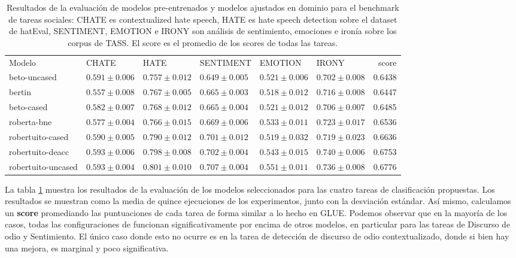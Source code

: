\begin{table}
    \centering
    \footnotesize
    \begin{tabular}{llllllr}
        \toprule
        Modelo             & CHATE             &  HATE             &  SENTIMENT        &  EMOTION          &  IRONY            &     score \\
        beto-uncased       & $0.591 \pm 0.006$ &  $0.757 \pm 0.012$ & $0.649 \pm 0.005$ & $0.521 \pm 0.006$ & $0.702 \pm 0.008$ &  0.6438 \\
        bertin             & $0.557 \pm 0.008$ &  $0.767 \pm 0.005$ & $0.665 \pm 0.003$ & $0.518 \pm 0.012$ & $0.716 \pm 0.008$ &  0.6447 \\
        beto-cased         & $0.582 \pm 0.007$ &  $0.768 \pm 0.012$ & $0.665 \pm 0.004$ & $0.521 \pm 0.012$ & $0.706 \pm 0.007$ &  0.6485 \\
        roberta-bne        & $0.577 \pm 0.004$ &  $0.766 \pm 0.015$ & $0.669 \pm 0.006$ & $0.533 \pm 0.011$ & $0.723 \pm 0.017$ &  0.6536 \\
        \hline
        robertuito-cased   & $0.590 \pm 0.005$ &  $0.790 \pm 0.012$ & $0.701 \pm 0.012$ & $0.519 \pm 0.032$ & $0.719 \pm 0.023$ &  0.6636 \\
        robertuito-deacc   & $0.593 \pm 0.006$ &  $0.798 \pm 0.008$ & $0.702 \pm 0.004$ & $0.543 \pm 0.015$ & $0.740 \pm 0.006$ &  0.6753 \\
        robertuito-uncased & $0.593 \pm 0.004$ &  $0.801 \pm 0.010$ & $0.707 \pm 0.004$ & $0.551 \pm 0.011$ & $0.736 \pm 0.008$ &  0.6776 \\
        \hline
    \end{tabular}
    \caption{Resultados de la evaluación de modelos pre-entrenados y modelos ajustados en dominio para el benchmark de tareas sociales: CHATE es contextualized hate speech, HATE es hate speech detection sobre el dataset de hatEval, SENTIMENT, EMOTION e IRONY son análisis de sentimiento, emociones e ironía sobre los corpus de TASS. El score es el promedio de los scores de todas las tareas.}
    \label{tab:robertuito_evaluation_results}
\end{table}


La tabla \ref{tab:robertuito_evaluation_results} muestra los resultados de la evaluación de los modelos seleccionados para las cuatro tareas de clasificación propuestas. Los resultados se muestran como la media de quince ejecuciones de los experimentos, junto con la desviación estándar. Así mismo, calculamos un \textbf{score} promediando las puntuaciones de cada tarea de forma similar a lo hecho en GLUE. Podemos observar que en la mayoría de los casos, todas las configuraciones de \robertuito{} funcionan significativamente por encima de otros modelos, en particular para las tareas de Discurso de odio y Sentimiento. El único caso donde esto no ocurre es en la tarea de detección de discurso de odio contextualizado, donde si bien hay una mejora, es marginal y poco significativa.

